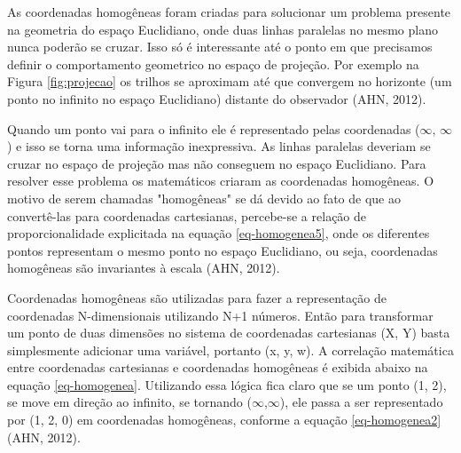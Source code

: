 \label{ap:coordenadas-homogeneas}

As coordenadas homogêneas foram criadas para solucionar um problema presente na geometria do espaço Euclidiano, onde duas linhas paralelas no mesmo plano nunca poderão se cruzar. Isso só é interessante até o ponto em que precisamos definir o comportamento geometrico no espaço de projeção. Por exemplo na Figura \ref{fig:projecao} os trilhos se aproximam até que convergem no horizonte (um ponto no infinito no espaço Euclidiano) distante do observador (AHN, 2012)\nocite{homogenous}.

	\begin{figure}[h!]
		\centering
	\end{figure}

Quando um ponto vai para o infinito ele é representado pelas coordenadas ($\infty$, $\infty$) e isso se torna uma informação inexpressiva. As linhas paralelas deveriam se cruzar no espaço de projeção mas não conseguem no espaço Euclidiano. Para resolver esse problema os matemáticos criaram as coordenadas homogêneas. O motivo de serem chamadas "homogêneas" se dá devido ao fato de que ao convertê-las para coordenadas cartesianas, percebe-se a relação de proporcionalidade explicitada na equação \ref{eq-homogenea5}, onde os diferentes pontos representam o mesmo ponto no espaço Euclidiano, ou seja, coordenadas homogêneas são invariantes à escala (AHN, 2012).

Coordenadas homogêneas são utilizadas para fazer a representação de coordenadas N-dimensionais utilizando N+1 números. Então para transformar um ponto de duas dimensões no sistema de coordenadas cartesianas (X, Y) basta simplesmente adicionar uma variável, portanto (x, y, w). A correlação matemática entre coordenadas cartesianas e coordenadas homogêneas é exibida abaixo na equação \ref{eq-homogenea}. Utilizando essa lógica fica claro que se um ponto (1, 2), se move em direção ao infinito, se tornando ($\infty$,$\infty$), ele passa a ser representado por (1, 2, 0) em coordenadas homogêneas, conforme a equação \ref{eq-homogenea2} (AHN, 2012).


